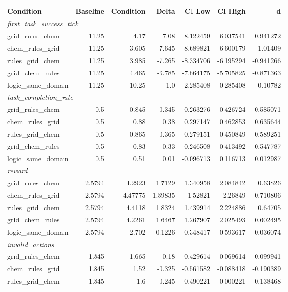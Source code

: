 \begin{tabular}{lrrrrrr}
\toprule
Condition & Baseline & Condition & Delta & CI Low & CI High & d \\
\midrule
  \multicolumn{7}{l}{\textit{first_task_success_tick}} \\
  grid_rules_chem & 11.25 & 4.17 & -7.08 & -8.122459 & -6.037541 & -0.941272 \\
  chem_rules_grid & 11.25 & 3.605 & -7.645 & -8.689821 & -6.600179 & -1.01409 \\
  rules_grid_chem & 11.25 & 3.985 & -7.265 & -8.334706 & -6.195294 & -0.941266 \\
  grid_chem_rules & 11.25 & 4.465 & -6.785 & -7.864175 & -5.705825 & -0.871363 \\
  logic_same_domain & 11.25 & 10.25 & -1.0 & -2.285408 & 0.285408 & -0.10782 \\
  \multicolumn{7}{l}{\textit{task_completion_rate}} \\
  grid_rules_chem & 0.5 & 0.845 & 0.345 & 0.263276 & 0.426724 & 0.585071 \\
  chem_rules_grid & 0.5 & 0.88 & 0.38 & 0.297147 & 0.462853 & 0.635644 \\
  rules_grid_chem & 0.5 & 0.865 & 0.365 & 0.279151 & 0.450849 & 0.589251 \\
  grid_chem_rules & 0.5 & 0.83 & 0.33 & 0.246508 & 0.413492 & 0.547787 \\
  logic_same_domain & 0.5 & 0.51 & 0.01 & -0.096713 & 0.116713 & 0.012987 \\
  \multicolumn{7}{l}{\textit{reward}} \\
  grid_rules_chem & 2.5794 & 4.2923 & 1.7129 & 1.340958 & 2.084842 & 0.63826 \\
  chem_rules_grid & 2.5794 & 4.47775 & 1.89835 & 1.52821 & 2.26849 & 0.710806 \\
  rules_grid_chem & 2.5794 & 4.4118 & 1.8324 & 1.439914 & 2.224886 & 0.64705 \\
  grid_chem_rules & 2.5794 & 4.2261 & 1.6467 & 1.267907 & 2.025493 & 0.602495 \\
  logic_same_domain & 2.5794 & 2.702 & 0.1226 & -0.348417 & 0.593617 & 0.036074 \\
  \multicolumn{7}{l}{\textit{invalid_actions}} \\
  grid_rules_chem & 1.845 & 1.665 & -0.18 & -0.429614 & 0.069614 & -0.099941 \\
  chem_rules_grid & 1.845 & 1.52 & -0.325 & -0.561582 & -0.088418 & -0.190389 \\
  rules_grid_chem & 1.845 & 1.6 & -0.245 & -0.490221 & 0.000221 & -0.138468 \\

\end{tabular}
